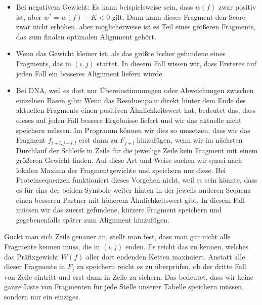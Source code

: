 \begin{itemize}
	\item Bei negativem Gewicht: Es kann beispielsweise sein, dass $w(f)$ zwar positiv ist, aber $w^* = w(f)-K < 0$ gilt. Dann kann dieses Fragment den Score zwar nicht erhöhen, aber möglicherweise ist es Teil eines größeren Fragments, das zum finalen optimalen Alignment gehört.
	\item Wenn das Gewicht kleiner ist, als das größte bisher gefundene eines Fragments, das in $(i,j)$ startet. In diesem Fall wissen wir, dass Ersteres auf jeden Fall ein besseres Alignment liefern würde.
	\item Bei DNA, weil es dort nur Übereinstimmungen oder Abweichungen zwischen einzelnen Basen gibt: Wenn das Residuenpaar direkt hinter dem Ende des aktuellen Fragments einen positiven Ähnlichkeitswert hat, bedeutet das, dass dieses auf jeden Fall bessere Ergebnisse liefert und wir das aktuelle nicht speichern müssen. Im Programm können wir dies so umsetzen, dass wir das Fragment $f_{i+l,j+l,l}$ erst dann zu $F_{j+l}$ hinzufügen, wenn wir im nächsten Durchlauf der Schleife in Zeile  für die jeweilige Zeile kein Fragment mit einem größeren Gewicht finden. Auf diese Art und Weise suchen wir quasi nach lokalen Maxima der Fragmentgewichte und speichern nur diese. Bei Proteinsequenzen funktioniert dieses Vorgehen nicht, weil es sein könnte, dass es für eins der beiden Symbole weiter hinten in der jeweils anderen Sequenz einen besseren Partner mit höherem Ähnlichkeitswert gibt. In diesem Fall müssen wir das zuerst gefundene, kürzere Fragment speichern und gegebenenfalls später zum Alignment hinzufügen. 
\end{itemize}

Guckt man sich Zeile  genauer an, stellt man fest, dass man gar nicht alle Fragmente kennen muss, die in $(i,j)$ enden. Es reicht das zu kennen, welches das Präfixgewicht $W(f)$ aller dort endenden Ketten maximiert. Anstatt alle dieser Fragmente in $F_j$ zu speichern reicht es zu überprüfen, ob der dritte Fall von Zeile  eintritt und erst dann in Zeile  zu sichern. Das bedeutet, dass wir keine ganze Liste von Fragmenten für jede Stelle unserer Tabelle speichern müssen, sondern nur ein einziges.

